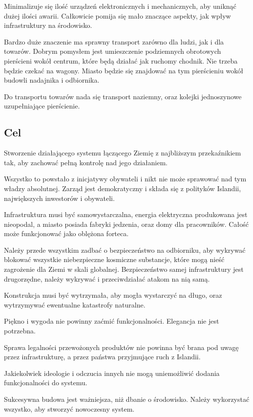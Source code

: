 Minimalizuje się ilość urządzeń elektronicznych i mechanicznych, aby uniknąć dużej ilości awarii.
Całkowicie pomija się mało znaczące aspekty, jak wpływ infrastruktury na środowisko.

Bardzo duże znaczenie ma sprawny transport zarówno dla ludzi, jak i dla towarów.
Dobrym pomysłem jest umieszczenie podziemnych obrotowych pierścieni wokół centrum, które będą działać jak ruchomy chodnik. Nie trzeba będzie czekać na wagony.
Miasto będzie się znajdować na tym pierścieniu wokół budowli nadajnika i odbiornika.

Do transportu towarów nada się transport naziemny, oraz kolejki jednoszynowe uzupełniające pierścienie.

\subsection{Cel}
Stworzenie działającego systemu łączącego Ziemię z najbliższym przekaźnikiem tak, aby zachować pełną kontrolę nad jego działaniem.

Wszystko to powstało z inicjatywy obywateli i nikt nie może sprawować nad tym władzy absolutnej. Zarząd jest demokratyczny i składa się z polityków Islandii, największych inwestorów i obywateli.

Infrastruktura musi być samowystarczalna, energia elektryczna produkowana jest nieopodal, a miasto posiada fabryki jedzenia, oraz domy dla pracowników. Całość może funkcjonować jako oblężona forteca.

Należy przede wszystkim zadbać o bezpieczeństwo na odbiorniku, aby wykrywać blokować wszystkie niebezpieczne kosmiczne substancje, które mogą nieść zagrożenie dla Ziemi w skali globalnej.
Bezpieczeństwo samej infrastruktury jest drugorzędne, należy wykrywać i przeciwdziałać atakom na nią samą.

Konstrukcja musi być wytrzymała, aby mogła wystarczyć na długo, oraz wytrzymywać ewentualne katastrofy naturalne.

Piękno i wygoda nie powinny zaćmić funkcjonalności. Elegancja nie jest potrzebna.

Sprawa legalności przewożonych produktów nie powinna być brana pod uwagę przez infrastrukturę, a przez państwa przyjmujące ruch z Islandii.

Jakiekolwiek ideologie i odczucia innych nie mogą uniemożliwić dodania funkcjonalności do systemu. 

Sukcesywna budowa jest ważniejsza, niż dbanie o środowisko. Należy wykorzystać wszystko, aby stworzyć nowoczesny system.

